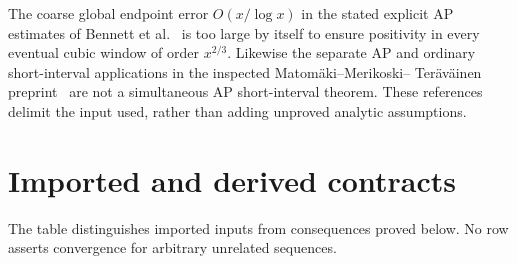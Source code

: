 \documentclass[11pt,reqno]{amsart}
\makeatletter
\newlength{\CenteredRowHeight}
\newcommand{\CenteredTableWidths}[6]{%
  \def\CenteredWidthA{#1}\def\CenteredWidthB{#2}%
  \def\CenteredWidthC{#3}\def\CenteredWidthD{#4}%
  \def\CenteredWidthE{#5}\def\CenteredWidthF{#6}}
\newcommand{\CenteredMeasure}[3]{%
  \global\setbox#1=\hbox{\parbox[c]{#2}{%
    \centering\setlength{\parindent}{0pt}#3\par}}%
  \ifdim\dimexpr\ht#1+\dp#1\relax>\CenteredRowHeight
    \global\CenteredRowHeight=\dimexpr\ht#1+\dp#1\relax
  \fi}
\newcommand{\CenteredRender}[2]{%
  \parbox[c][\CenteredRowHeight][c]{#2}{%
    \centering\setlength{\parindent}{0pt}\usebox{#1}\par}}
\newcommand{\CenteredRowThree}[4][0pt]{%
  \global\CenteredRowHeight=0pt\relax%
  \CenteredMeasure{\CenteredBoxA}{\CenteredWidthA}{#2}%
  \CenteredMeasure{\CenteredBoxB}{\CenteredWidthB}{#3}%
  \CenteredMeasure{\CenteredBoxC}{\CenteredWidthC}{#4}%
  \global\advance\CenteredRowHeight by \dimexpr 2pt+#1\relax%
  \CenteredRender{\CenteredBoxA}{\CenteredWidthA} &%
  \CenteredRender{\CenteredBoxB}{\CenteredWidthB} &%
  \CenteredRender{\CenteredBoxC}{\CenteredWidthC}}
\theoremstyle{blueplain}
\newcounter{asser}
\newcommand{\defref}[1]{\hyperref[#1]{Definition~\ref*{#1}}}
\providecommand{\comma}{\allowbreak,\,}
\numberwithin{equation}{section}
\DeclareRobustCommand{\defref}[1]{%
  \hyperlink{def:#1}{\ensuremath{\csname PredicateName@#1\endcsname}}}
\def\defref#1{#1}%
\def\hyperlink#1#2{#2}}
\makeatother
\begin{document}
The coarse global endpoint error \(O(x/\log x)\) in the stated explicit
\hyperlink{term:AP}{AP} estimates of Bennett et al.~\cite{BennettMartinOBryantRechnitzer2018}
is too large by itself to ensure positivity in every eventual cubic
window of order \(x^{2/3}\). Likewise the separate \hyperlink{term:AP}{AP} and ordinary
short-interval applications in the inspected Matom\"aki--Merikoski--
Ter\"av\"ainen preprint~\cite{MatomakiMerikoskiTeravainen2024} are not a
simultaneous \hyperlink{term:AP}{AP} short-interval theorem. These references delimit the
input used, rather than adding unproved analytic assumptions.

\section{Imported and derived contracts}\label{sec:postulates}
The table distinguishes imported inputs from consequences proved below.
No row asserts convergence for arbitrary unrelated sequences.
\begin{center}\scriptsize
\CenteredTableWidths{1cm}{10.7cm}{3.6cm}{1pt}{1pt}{1pt}
\end{center}
\end{document}
